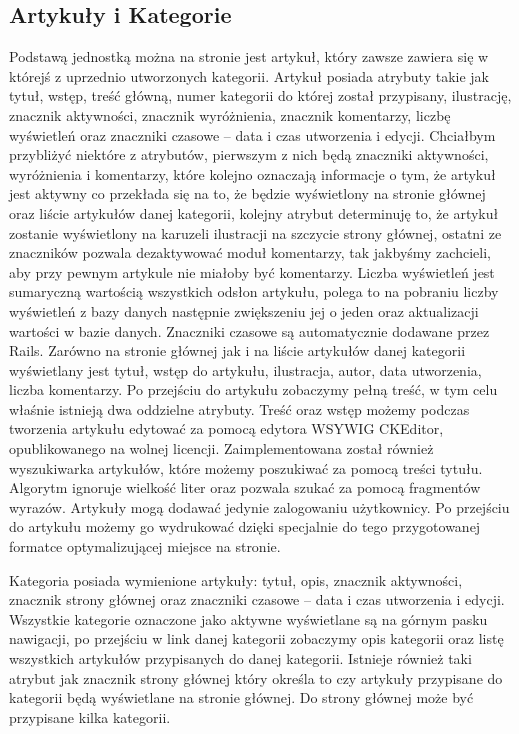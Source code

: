 \documentclass[openright]{xmgr}
\begin{document}
\subsection{Artykuły i Kategorie}
Podstawą jednostką można na stronie jest artykuł, który zawsze zawiera się w którejś z uprzednio utworzonych kategorii. Artykuł posiada atrybuty takie jak tytuł, wstęp, treść główną, numer kategorii do której został przypisany, ilustrację, znacznik aktywności, znacznik wyróżnienia, znacznik komentarzy, liczbę wyświetleń oraz znaczniki czasowe – data i czas utworzenia i edycji. Chciałbym przybliżyć niektóre z atrybutów, pierwszym z nich będą znaczniki aktywności, wyróżnienia i komentarzy, które kolejno oznaczają informacje o tym, że artykuł jest aktywny co przekłada się na to, że będzie wyświetlony na stronie głównej oraz liście artykułów danej kategorii, kolejny atrybut determinuję to, że artykuł zostanie wyświetlony na karuzeli ilustracji na szczycie strony głównej, ostatni ze znaczników pozwala dezaktywować moduł komentarzy, tak jakbyśmy zachcieli, aby przy pewnym artykule nie miałoby być komentarzy. Liczba wyświetleń jest sumaryczną wartością wszystkich odsłon artykułu, polega to na pobraniu liczby wyświetleń z bazy danych następnie zwiększeniu jej o jeden oraz aktualizacji wartości w bazie danych. Znaczniki czasowe są automatycznie dodawane przez Rails. Zarówno na stronie głównej jak i na liście artykułów danej kategorii wyświetlany jest tytuł, wstęp do artykułu, ilustracja, autor, data utworzenia, liczba komentarzy. Po przejściu do artykułu zobaczymy pełną treść, w tym celu właśnie istnieją dwa oddzielne atrybuty. Treść oraz wstęp możemy podczas tworzenia artykułu edytować za pomocą edytora WSYWIG CKEditor, opublikowanego na wolnej licencji. Zaimplementowana został również wyszukiwarka artykułów, które możemy poszukiwać za pomocą treści tytułu. Algorytm ignoruje wielkość liter oraz pozwala szukać za pomocą fragmentów wyrazów. Artykuły mogą dodawać jedynie zalogowaniu użytkownicy. Po przejściu do artykułu możemy go wydrukować dzięki specjalnie do tego przygotowanej formatce optymalizującej miejsce na stronie. 

Kategoria posiada wymienione artykuły: tytuł, opis, znacznik aktywności, znacznik strony głównej oraz znaczniki czasowe – data i czas utworzenia i edycji. Wszystkie kategorie oznaczone jako aktywne wyświetlane są na górnym pasku nawigacji, po przejściu w link danej kategorii zobaczymy opis kategorii oraz listę wszystkich artykułów przypisanych do danej kategorii. Istnieje również taki atrybut jak znacznik strony głównej który określa to czy artykuły przypisane do kategorii będą wyświetlane na stronie głównej. Do strony głównej może być przypisane kilka kategorii. 
\end{document}
